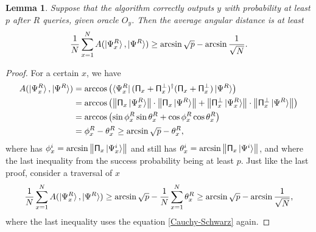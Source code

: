 \documentclass[a4paper,10pt]{book}
\newtheorem{lemma}{Lemma}[section]
\numberwithin{equation}{section}
\begin{document}
\begin{lemma}
    Suppose that the algorithm correctly outputs $y$ with probability at least $p$ after $R$ queries, given oracle $O_{y}$. Then the average angular distance is at least
    \begin{equation}
        \frac{1}{N}\sum_{x=1}^{N}A(\ket{\Psi_{x}^{R}},\ket{\Psi^{R}})\geq \arcsin\sqrt{p}-\arcsin\frac{1}{\sqrt{N}}.
    \end{equation}
\end{lemma}
\begin{proof}
    For a certain $x$, we have
    \begin{equation*}
        \begin{split}
            A(\ket{\Psi_{x}^{R}},\ket{\Psi^{R}})
             & = \arccos\left(\bra{\Psi_{x}^{R}}(\mathsf{\Pi}_{x}+\mathsf{\Pi}_{x}^{\perp})^{\dagger}(\mathsf{\Pi}_{x}+\mathsf{\Pi}_{x}^{\perp})\ket{\Psi^{R}}\right)                                                                                        \\
             & = \arccos\left(\left\|\mathsf{\Pi}_{x}\ket{\Psi_{x}^{R}}\right\|\cdot\left\|\mathsf{\Pi}_{x}\ket{\Psi^{R}}\right\|+\left\|\mathsf{\Pi}_{x}^{\perp}\ket{\Psi_{x}^{R}}\right\|\cdot\left\|\mathsf{\Pi}_{x}^{\perp}\ket{\Psi^{R}}\right\|\right) \\
             & = \arccos\left(\sin\phi_{x}^{R}\sin\theta_{x}^{R}+\cos\phi_{x}^{R}\cos\theta_{x}^{R}\right)                                                                                                                                                   \\
             & = \phi_{x}^{R}-\theta_{x}^{R} \geq \arcsin\sqrt{p}-\theta_{x}^{R},
        \end{split}
    \end{equation*}
    where has $\phi_{x}^{i}=\arcsin\left\| \mathsf{\Pi}_{x}\ket{\Psi_{x}^{i}}\right\|$ and still has $\theta_{x}^{i}=\arcsin\left\| \mathsf{\Pi}_{x}\ket{\Psi^{i}}\right\|$, and where the last inequality from the success probability being at least $p$. Just like the last proof, consider a traversal of $x$
    \begin{equation*}
        \frac{1}{N}\sum_{x=1}^{N}A(\ket{\Psi_{x}^{R}},\ket{\Psi^{R}})
        \geq \arcsin\sqrt{p}-\frac{1}{N}\sum_{x=1}^{N}\theta_{x}^{R}
        \geq \arcsin\sqrt{p}-\arcsin\frac{1}{\sqrt{N}},
    \end{equation*}
    where the last inequality uses the equation \ref{Cauchy-Schwarz} again.
\end{proof}
\end{document}
